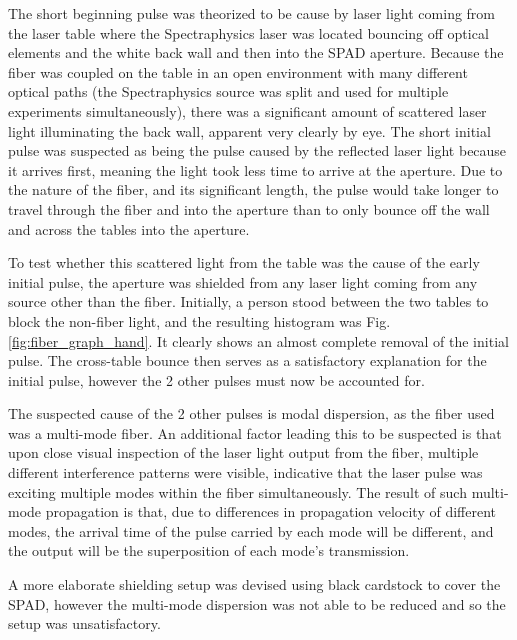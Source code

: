 \documentclass[a4paper]{article}
\begin{document}
The short beginning pulse was theorized to be cause by laser light coming from the laser table where the Spectraphysics laser was located bouncing off optical elements and the white back wall and then into the SPAD aperture. Because the fiber was coupled on the table in an open environment with many different optical paths (the Spectraphysics source was split and used for multiple experiments simultaneously), there was a significant amount of scattered laser light illuminating the back wall, apparent very clearly by eye. The short initial pulse was suspected as being the pulse caused by the reflected laser light because it arrives first, meaning the light took less time to arrive at the aperture. Due to the nature of the fiber, and its significant length, the pulse would take longer to travel through the fiber and into the aperture than to only bounce off the wall and across the tables into the aperture.

To test whether this scattered light from the table was the cause of the early initial pulse, the aperture was shielded from any laser light coming from any source other than the fiber. Initially, a person stood between the two tables to block the non-fiber light, and the resulting histogram was Fig.\ref{fig:fiber_graph_hand}. It clearly shows an almost complete removal of the initial pulse. The cross-table bounce then serves as a satisfactory explanation for the initial pulse, however the 2 other pulses must now be accounted for.

The suspected cause of the 2 other pulses is modal dispersion, as the fiber used was a multi-mode fiber. An additional factor leading this to be suspected is that upon close visual inspection of the laser light output from the fiber, multiple different interference patterns were visible, indicative that the laser pulse was exciting multiple modes within the fiber simultaneously. The result of such multi-mode propagation is that, due to differences in propagation velocity of different modes, the arrival time of the pulse carried by each mode will be different, and the output will be the superposition of each mode's transmission.

%
%

A more elaborate shielding setup was devised using black cardstock to cover the SPAD, however the multi-mode dispersion was not able to be reduced and so the setup was unsatisfactory.
\end{document}
